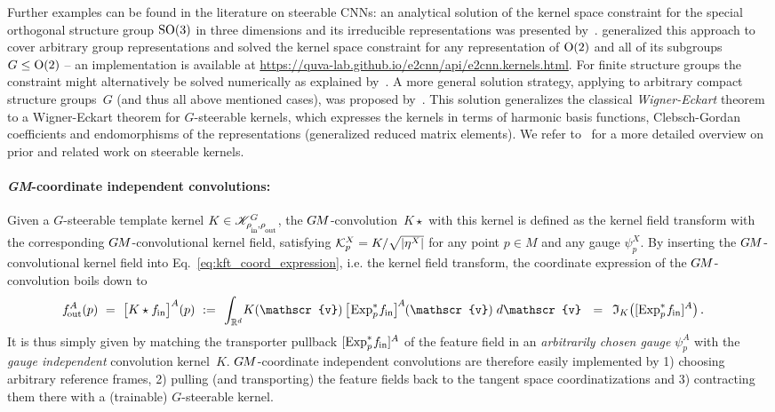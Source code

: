 Further examples can be found in the literature on steerable CNNs:
an analytical solution of the kernel space constraint for the special orthogonal structure group $\operatorname{SO}(3)$ in three dimensions and its irreducible representations was presented by~\citet{3d_steerableCNNs}.
\citet{Weiler2019_E2CNN} generalized this approach to cover arbitrary group representations and solved the kernel space constraint for any representation of $\operatorname{O}(2)$ and all of its subgroups $G\leq\operatorname{O}(2)$
-- an implementation is available at \url{https://quva-lab.github.io/e2cnn/api/e2cnn.kernels.html}.
For finite structure groups the constraint might alternatively be solved numerically as explained by~\citet{Cohen2017-STEER}.
A more general solution strategy, applying to arbitrary compact structure groups~$G$ (and thus all above mentioned cases), was proposed by~\citet{lang2020WignerEckart}.
This solution generalizes the classical \emph{Wigner-Eckart} theorem~\cite{agrawalla1980WignerEckart,jeevanjee2011reprOp,wigner1931gruppentheorie,wigner1993matrices} to a Wigner-Eckart theorem for $G$-steerable kernels, which expresses the kernels in terms of harmonic basis functions, Clebsch-Gordan coefficients and endomorphisms of the representations (generalized reduced matrix elements).
We refer to~\cite{lang2020WignerEckart} for a more detailed overview on prior and related work on steerable kernels.












\paragraph{\textit{GM}-coordinate independent convolutions:}

Given a $G$-steerable template kernel $K\in\KG$, the $G\mkern-1.4muM$-convolution~$K\star$ with this kernel is defined as the kernel field transform with the corresponding $G\mkern-1.4muM$-convolutional kernel field, satisfying $\mathcal{K}_p^X = K / \sqrt{|\eta^X|}$ for any point $p\in M$ and any gauge $\psi_p^X$.
By inserting the $G\mkern-1.4muM$-convolutional kernel field into Eq.~\eqref{eq:kft_coord_expression}, i.e. the kernel field transform, the coordinate expression of the $G\mkern-1.4muM$-convolution boils down to
\begin{align}\label{eq:gauge_conv_coord_expression}
    \fout^A(p)
    \ =\ 
    \big[ K \star \fin \big]^A(p)
    \ :=&\,\ 
        \int_{\R^d} \!
        K(\mathscr{v}) \,
        \big[\mkern-2mu \Expspfin\big]^{\mkern-2mu A} \mkern-1mu(\mathscr{v})
        \; d\mathscr{v}
    \ \ =\,\ \mathfrak{I}_K \big( [\Expspfin]^A \big)
    \,.
\end{align}
It is thus simply given by matching the transporter pullback $[\operatorname{Exp}^*_p\mkern-2mu f_\textup{\;\!\!in}]^A$ of the feature field in an \emph{arbitrarily chosen gauge} $\psi_p^A$ with the \emph{gauge independent} convolution kernel~$K$.
$G\mkern-1.4muM$-coordinate independent convolutions are therefore easily implemented by
1) choosing arbitrary reference frames,
2) pulling (and transporting) the feature fields back to the tangent space coordinatizations and
3) contracting them there with a (trainable) $G$-steerable kernel.

